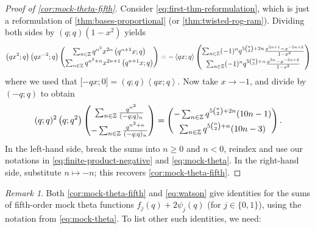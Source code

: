 \documentclass[reqno,11pt]{amsart}
\theoremstyle{definition}
\theoremstyle{remark}
\newtheorem*{remark}{Remark}
\numberwithin{equation}{section}
\newcommand{\Z}{\mathbb{Z}}
\newcommand{\la}{\left\langle}
\newcommand{\ra}{\right\rangle}
\newcommand{\vect}[2]{\big[{#1};{#2}\big]}
\newcommand{\fix}[1]{\textcolor{blue}{\large (#1)\normalsize}}
\begin{document}
\begin{proof}[Proof of \cref{cor:mock-theta-fifth}]
Consider \cref{eq:first-thm-reformulation}, which is just a reformulation of \cref{thm:bases-proportional} (or \cref{thm:twisted-rog-ram}). Dividing both sides by $(q; q)\left(1 - x^2\right)$ yields
\[
    \left(qx^2; q\right)\left(qx^{-2}; q\right)
    \begin{pmatrix}
    \sum_{n \in \Z} q^{n^2} x^{2n}  \left( q^{n+1}x; q\right) \vspace{0.1cm} \\ 
    \sum_{n \in \Z} q^{n^2 + n}x^{2n+1}  \left( q^{n+1}x; q\right)
    \end{pmatrix}
    = 
    -\la qx; q \ra
    \begin{pmatrix}
    \sum_{n \in \Z} (-1)^n q^{5\binom{n}{2} + 2n} \frac{x^{5n+1} - x^{-5n+2}}{1-x^2}
    \vspace{0.1cm} \\
    \sum_{n \in \Z} (-1)^n q^{5\binom{n}{2} + n} \frac{x^{5n} - x^{-5n+3}}{1-x^2}
    \end{pmatrix}
\]
where we used that $\vect{-qx}{0} = (q; q) \la qx; q \ra$.
Now take $x \to -1$, and divide by $(-q; q)$ to obtain
\[
    (q; q)^2 \left(q; q^2\right)
    \begin{pmatrix}
    \sum_{n \in \Z} \frac{q^{n^2}}{(-q; q)_n} \vspace{0.1cm} \\ 
    -\sum_{n \in \Z} \frac{q^{n^2 + n}}{(-q; q)_n}
    \end{pmatrix}
    =
    \begin{pmatrix}
    -\sum_{n \in \Z} q^{5\binom{n}{2} + 2n} (10n-1)
    \vspace{0.1cm} \\
    \sum_{n \in \Z} q^{5\binom{n}{2} + n} (10n-3)
    \end{pmatrix}.
\]
In the left-hand side, break the sums into $n \ge 0$ and $n < 0$, reindex and use our notations in \cref{eq:finite-product-negative} and \cref{eq:mock-theta}. In the right-hand side, substitute $n \mapsto -n$; this recovers \cref{cor:mock-theta-fifth}.
\end{proof}

\begin{remark}
Both \cref{cor:mock-theta-fifth} and \cref{eq:watson} give identities for the sums of fifth-order mock theta functions $f_j(q) + 2\psi_j(q)$ (for $j \in \{0, 1\}$), using the notation from \cref{eq:mock-theta}. To list other such identities, we need:
\end{remark}
\end{document}
